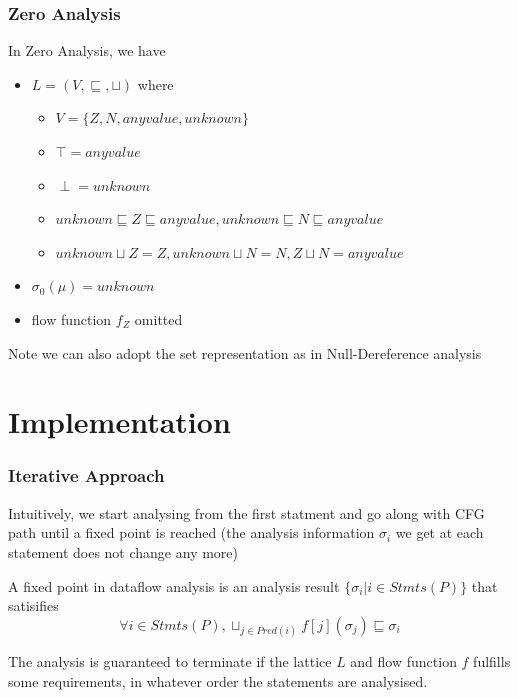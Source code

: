 \documentclass[]{beamer}
\begin{document}
\begin{frame}
  \frametitle{Zero Analysis}
  In Zero Analysis, we have
  \begin{itemize}
    \item $L=(V, \sqsubseteq, \sqcup)$ where
      \begin{itemize}
      \item $V=\{Z, N, anyvalue, unknown\}$
      \item $\top = anyvalue$
      \item $\perp = unknown$
      \item $unknown \sqsubseteq Z \sqsubseteq anyvalue, unknown \sqsubseteq N \sqsubseteq anyvalue$
      \item $unknown \sqcup Z = Z, unknown \sqcup N = N, Z \sqcup N = anyvalue$
      \end{itemize}
    \item $\sigma_0(\mu) = unknown$
    \item flow function $f_{Z}$ omitted
  \end{itemize}

  \pause
  Note we can also adopt the set representation as in Null-Dereference
  analysis
\end{frame}

\section{Implementation}
\frame{\tableofcontents[currentsection]}

\begin{frame}
  \frametitle{Iterative Approach}
  Intuitively, we start analysing from the first statment and go along with CFG path until
  a \alert{fixed point} is reached (the analysis
  information $\sigma_i$ we get at each statement does not change any more)

  \vspace{1em}\pause
  A fixed point in dataflow analysis is an analysis result
  $\{\sigma_i | i \in Stmts(P)\}$ that satisifies
  $$\forall i \in Stmts(P), \sqcup_{j \in Pred(i)}f[j](\sigma_j) \sqsubseteq \sigma_i $$

  \vspace{1em}\pause
  The analysis is guaranteed to terminate if the lattice $L$ and flow function $f$ fulfills
  some requirements, in whatever order the statements are analysised.
\end{frame}
\end{document}
